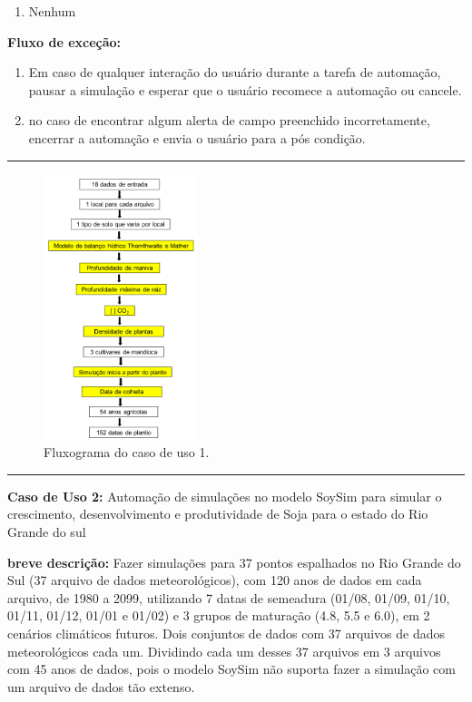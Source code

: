 \documentclass[tg]{mdtufsm}
\begin{document}
	\begin{enumerate}
		\item Nenhum
	\end{enumerate}
		
	{\bf Fluxo de exceção:}
	
	\begin{enumerate}
		\item Em caso de qualquer interação do usuário durante a tarefa de automação, pausar a simulação e esperar que o usuário recomece a automação ou cancele.
		\item no caso de encontrar algum alerta de campo preenchido incorretamente, encerrar a automação e envia o usuário para a pós condição.
	\end{enumerate}
	
	\bigskip \hrule \bigskip 
	
	\begin{figure}[!htbp]
		{\centering
		\includegraphics[width=0.4\textwidth]{SimanihotFlux}
		\caption{Fluxograma do caso de uso 1.}
		\label{fig:SimanihotFlux}}
	\end{figure}	
	
	\bigskip \hrule \bigskip
	
	{\bf Caso de Uso 2:} Automação de simulações no modelo SoySim para simular o crescimento, desenvolvimento e produtividade de Soja para o estado do Rio Grande do sul
	\bigskip
	
	{\bf breve descrição:} Fazer simulações para 37 pontos espalhados no Rio Grande do Sul (37 arquivo de dados meteorológicos), com 120 anos de dados em cada arquivo, de 1980 a 2099, utilizando 7 datas de semeadura (01/08, 01/09, 01/10, 01/11, 01/12, 01/01 e 01/02) e 3 grupos de maturação (4.8, 5.5 e 6.0), em 2 cenários climáticos futuros. Dois conjuntos de dados com 37 arquivos de dados meteorológicos cada um. Dividindo cada um desses 37 arquivos em 3 arquivos com 45 anos de dados, pois o modelo SoySim não suporta fazer a simulação com um arquivo de dados tão extenso.
	\bigskip
	
\end{document}

